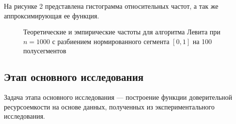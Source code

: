 На рисунке 2 представлена гистограмма относительных частот, а так же аппроксимирующая ее функция.

\begin{figure}[h!]
\caption{Теоретические и эмпирические частоты для алгоритма Левита при $n = 1000$ с разбиением нормированного сегмента $[0, 1]$ на 100 полусегментов}
\label{ris:image1}
\end{figure}

\subsection{Этап основного исследования}

Задача этапа основного исследования — построение функции доверительной ресурсоемкости на основе данных, полученных из экспериментального исследования.

